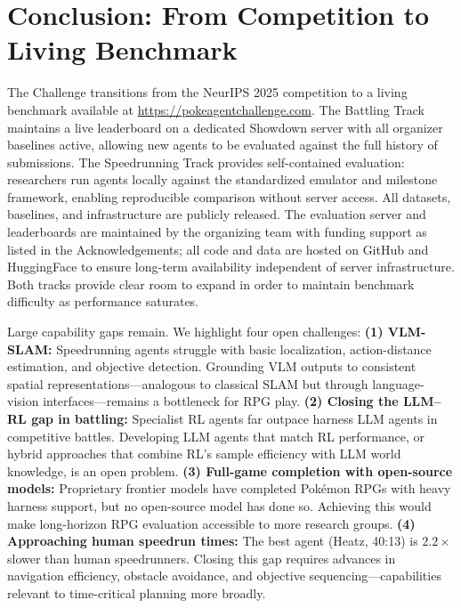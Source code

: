 \section{Conclusion: From Competition to Living Benchmark}
\label{sec:living-benchmark}

The \pokeagent Challenge transitions from the NeurIPS 2025 competition to a living benchmark available at \url{https://pokeagentchallenge.com}. The Battling Track maintains a live leaderboard on a dedicated Showdown server with all organizer baselines active, allowing new agents to be evaluated against the full history of submissions. The Speedrunning Track provides self-contained evaluation: researchers run agents locally against the standardized emulator and milestone framework, enabling reproducible comparison without server access. All datasets, baselines, and infrastructure are publicly released. The evaluation server and leaderboards are maintained by the organizing team with funding support as listed in the Acknowledgements; all code and data are hosted on GitHub and HuggingFace to ensure long-term availability independent of server infrastructure. Both tracks provide clear room to expand in order to maintain benchmark difficulty as performance saturates.

Large capability gaps remain. We highlight four open challenges: \textbf{(1) VLM-SLAM:} Speedrunning agents struggle with basic localization, action-distance estimation, and objective detection. Grounding VLM outputs to consistent spatial representations---analogous to classical SLAM but through language-vision interfaces---remains a bottleneck for RPG play. \textbf{(2) Closing the LLM--RL gap in battling:} Specialist RL agents far outpace harness LLM agents in competitive battles. Developing LLM agents that match RL performance, or hybrid approaches that combine RL's sample efficiency with LLM world knowledge, is an open problem. \textbf{(3) Full-game completion with open-source models:} Proprietary frontier models have completed Pokémon RPGs with heavy harness support, but no open-source model has done so. Achieving this would make long-horizon RPG evaluation accessible to more research groups. \textbf{(4) Approaching human speedrun times:} The best agent (Heatz, 40:13) is $2.2\times$ slower than human speedrunners. Closing this gap requires advances in navigation efficiency, obstacle avoidance, and objective sequencing---capabilities relevant to time-critical planning more broadly.
